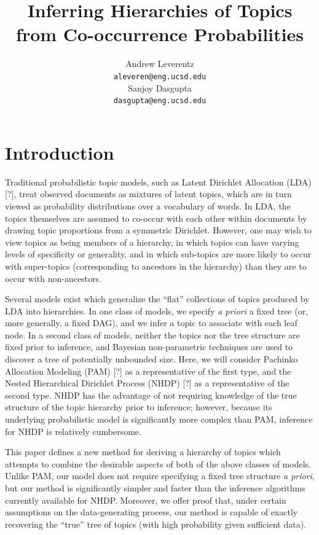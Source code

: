 \documentclass{article}
\title{Inferring Hierarchies of Topics from Co-occurrence Probabilities}
\author{
  Andrew Leverentz \\
  \texttt{aleveren@eng.ucsd.edu} \\
  Sanjoy Dasgupta \\
  \texttt{dasgupta@eng.ucsd.edu}
}
\date{}
\theoremstyle{definition}
\newcommand{\tocite}{[?]}
\begin{document}
\maketitle


\section{Introduction}

Traditional probabilistic topic models, such as Latent Dirichlet Allocation (LDA) \tocite{}, treat observed documents as mixtures of latent topics, which are in turn viewed as probability distributions over a vocabulary of words.
In LDA, the topics themselves are assumed to co-occur with each other within documents by drawing topic proportions from a symmetric Dirichlet.
However, one may wish to view topics as being members of a hierarchy, in which topics can have varying levels of specificity or generality, and in which sub-topics are more likely to occur with super-topics (corresponding to ancestors in the hierarchy) than they are to occur with non-ancestors.

Several models exist which generalize the ``flat'' collections of topics produced by LDA into hierarchies.
In one class of models, we specify \emph{a priori} a fixed tree (or, more generally, a fixed DAG), and we infer a topic to associate with each leaf node.
In a second class of models, neither the topics nor the tree structure are fixed prior to inference, and Bayesian non-parametric techniques are used to discover a tree of potentially unbounded size.
Here, we will consider Pachinko Allocation Modeling (PAM) \tocite{} as a representative of the first type, and the Nested Hierarchical Dirichlet Process (NHDP) \tocite{} as a representative of the second type.
NHDP has the advantage of not requiring knowledge of the true structure of the topic hierarchy prior to inference;
however, because its underlying probabilistic model is significantly more complex than PAM, inference for NHDP is relatively cumbersome.

This paper defines a new method for deriving a hierarchy of topics which attempts to combine the desirable aspects of both of the above classes of models.
Unlike PAM, our model does not require specifying a fixed tree structure \emph{a priori}, but our method is significantly simpler and faster than the inference algorithms currently available for NHDP.
Moreover, we offer proof that, under certain assumptions on the data-generating process, our method is capable of exactly recovering the ``true'' tree of topics (with high probability given sufficient data).
\end{document}
